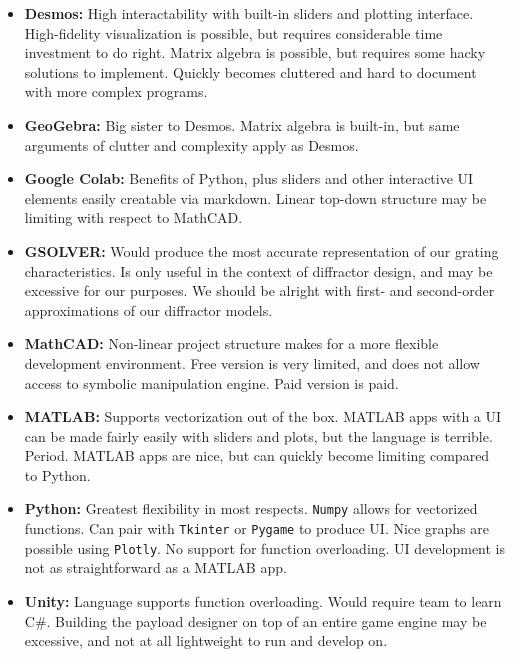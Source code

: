 \documentclass{article}
\begin{document}
\begin{itemize}
    \item \textbf{Desmos:} High interactability with built-in sliders and plotting interface. High-fidelity visualization is possible, but requires considerable time investment to do right. Matrix algebra is possible, but requires some hacky solutions to implement. Quickly becomes cluttered and hard to document with more complex programs.
    
    \item \textbf{GeoGebra:} Big sister to Desmos. Matrix algebra is built-in, but same arguments of clutter and complexity apply as Desmos.
    
    \item \textbf{Google Colab:} Benefits of Python, plus sliders and other interactive UI elements easily creatable via markdown. Linear top-down structure may be limiting with respect to MathCAD.

    \item \textbf{GSOLVER:} Would produce the most accurate representation of our grating characteristics. Is only useful in the context of diffractor design, and may be excessive for our purposes. We should be alright with first- and second-order approximations of our diffractor models.
    
    \item \textbf{MathCAD:} Non-linear project structure makes for a more flexible development environment. Free version is very limited, and does not allow access to symbolic manipulation engine. Paid version is paid.
    
    \item \textbf{MATLAB:} Supports vectorization out of the box. MATLAB apps with a UI can be made fairly easily with sliders and plots, but the language is terrible. Period. MATLAB apps are nice, but can quickly become limiting compared to Python.
    
    \item \textbf{Python:} Greatest flexibility in most respects. \texttt{Numpy} allows for vectorized functions.  Can pair with \texttt{Tkinter} or \texttt{Pygame} to produce UI. Nice graphs are possible using \texttt{Plotly}. No support for function overloading. UI development is not as straightforward as a MATLAB app.
    
    \item \textbf{Unity:} Language supports function overloading. Would require team to learn C\#. Building the payload designer on top of an entire game engine may be excessive, and not at all lightweight to run and develop on.
\end{itemize}
\end{document}
